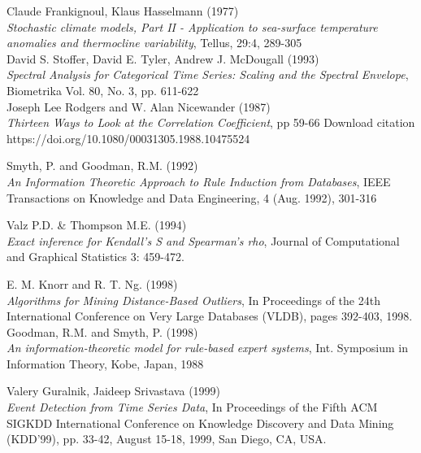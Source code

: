 \documentclass[12pt,a4paper]{article}
\begin{document}
\begin{thebibliography}{9}
Claude Frankignoul, Klaus Hasselmann (1977) \\
\textit{Stochastic climate models, Part II - Application to sea-surface temperature anomalies and thermocline variability},
Tellus, 29:4, 289-305\\

David S. Stoffer, David E. Tyler, Andrew J. McDougall (1993)\\
\textit{Spectral Analysis for Categorical Time Series: Scaling and the Spectral Envelope},
Biometrika Vol. 80, No. 3, pp. 611-622\\

Joseph Lee Rodgers and W. Alan Nicewander (1987)\\
\textit{Thirteen Ways to Look at the Correlation Coefficient}, pp 59-66
Download citation  https://doi.org/10.1080/00031305.1988.10475524

Smyth, P. and Goodman, R.M. (1992)\\
\emph{An Information Theoretic Approach to Rule Induction from Databases}, IEEE Transactions on Knowledge and Data Engineering, 4 (Aug. 1992), 301-316

Valz P.D. \& Thompson M.E. (1994) \\
\textit{Exact inference for Kendall's
S and Spearman's rho}, Journal of Computational and
Graphical Statistics 3: 459-472.

E. M. Knorr and R. T. Ng. (1998)\\
\textit{Algorithms for Mining Distance-Based Outliers}, In Proceedings of the 24th
International Conference on Very Large Databases (VLDB), pages 392-403, 1998.\\

Goodman, R.M. and Smyth, P. (1998)\\
\emph{An information-theoretic model for rule-based expert systems}, Int. Symposium in Information Theory, Kobe, Japan, 1988

Valery Guralnik, Jaideep Srivastava (1999)\\
\textit{Event Detection from Time Series Data}, In Proceedings of the Fifth ACM SIGKDD International Conference on Knowledge Discovery and Data Mining (KDD'99), pp. 33-42, August 15-18, 1999, San Diego, CA, USA. \\


\end{thebibliography}
\end{document}
